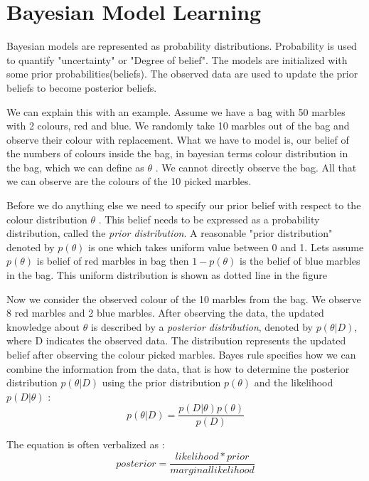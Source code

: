 \documentclass[11pt]{book}
\begin{document}
\section{Bayesian Model Learning}

Bayesian models are represented as probability distributions. Probability is used to quantify "uncertainty" or "Degree of belief". The models are initialized with some prior probabilities(beliefs). The observed data are used to update the prior beliefs to become posterior beliefs.

We can explain this with an example. Assume we have a bag with 50 marbles with 2 colours, red and blue. We randomly take 10 marbles out of the bag and observe their colour with replacement. What we have to model is, our belief of the numbers of colours inside the bag, in bayesian  terms colour distribution in the bag, which we can define as $\theta$ . We cannot directly observe the bag. All that we can observe are the colours of the 10 picked marbles.

Before we do anything else we need to specify our prior belief with respect to the colour distribution $\theta$ . This belief needs to be expressed as a probability distribution, called the \emph{prior distribution}. A reasonable "prior distribution" denoted by $p(\theta)$ is one which takes uniform value between 0 and 1. Lets assume $p(\theta)$ is belief of red marbles in bag then $1 - p(\theta)$  is the belief of blue marbles in the bag. This uniform distribution is shown as dotted line in the figure 

Now we consider the observed colour of the 10 marbles from the bag. We observe 8 red marbles and 2 blue marbles. After observing the data, the updated knowledge about $\theta$ is described by a \emph{posterior distribution}, denoted by $p(\theta | D)$, where D indicates the observed data. The distribution represents the updated belief after observing the colour picked marbles. Bayes rule specifies how we can combine the information from the data, that is how to determine the posterior distribution $p (\theta | D)$ using  the prior distribution $p(\theta)$ and the likelihood  $p (D | \theta)$ :
\begin{equation}
	p(\theta | D) = \frac{p(D | \theta) p(\theta)}{p(D)}
\end{equation}

The equation is often verbalized as :
\begin{equation}
	posterior = \frac{likelihood * prior}{marginal likelihood}
\end{equation}
\end{document}

